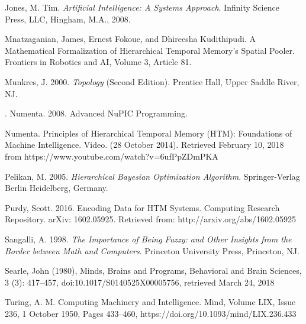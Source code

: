 \documentclass[oneside,12pt,openany]{book}
\begin{document}
\begin{thebibliography}{99}
		 Jones, M. Tim. \emph{Artificial Intelligence: A Systems Approach}. Infinity Science Press, LLC, Hingham, M.A., 2008.
		
		 Mnatzaganian, James, Ernest Fokoue, and Dhireesha Kudithipudi. A Mathematical Formalization of Hierarchical Temporal Memory's Spatial Pooler. Frontiers in Robotics and AI, Volume 3, Article 81.
		
		 Munkres, J. 2000. \textit{Topology} (Second Edition). Prentice Hall, Upper Saddle River, NJ.
		
		. Numenta. 2008. Advanced NuPIC Programming. 
		
		 Numenta. Principles of Hierarchical Temporal Memory (HTM): Foundations of Machine Intelligence. Video. (28 October 2014). Retrieved February 10, 2018 from https://www.youtube.com/watch?v=6ufPpZDmPKA
		
		 Pelikan, M. 2005. \textit{Hierarchical Bayesian Optimization Algorithm}. Springer-Verlag Berlin Heidelberg, Germany.
		
		 Purdy, Scott. 2016. Encoding Data for HTM Systems. Computing Research Repository. arXiv: 1602.05925. Retrieved from: http://arxiv.org/abs/1602.05925
		
		 Sangalli, A. 1998. \textit{The Importance of Being Fuzzy: and Other Insights from the Border between Math and Computers}. Princeton University Press, Princeton, NJ.
		
		 Searle, John (1980), Minds, Brains and Programs, Behavioral and Brain Sciences, 3 (3): 417–457, doi:10.1017/S0140525X00005756, retrieved March 24, 2018
		
		 Turing, A. M. Computing Machinery and Intelligence. Mind, Volume LIX, Issue 236, 1 October 1950, Pages 433–460, https://doi.org/10.1093/mind/LIX.236.433
		
		
	\end{thebibliography}
	
\end{document}

